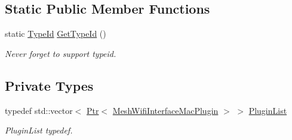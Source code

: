 \subsection*{Static Public Member Functions}
\begin{DoxyCompactItemize}
\item 
static \hyperlink{classns3_1_1TypeId}{Type\+Id} \hyperlink{classns3_1_1MeshWifiInterfaceMac_ac8a895086b33d99018b3e5b5b2add731}{Get\+Type\+Id} ()
\begin{DoxyCompactList}\small\item\em Never forget to support typeid. \end{DoxyCompactList}\end{DoxyCompactItemize}
\subsection*{Private Types}
\begin{DoxyCompactItemize}
\item 
typedef std\+::vector$<$ \hyperlink{classns3_1_1Ptr}{Ptr}$<$ \hyperlink{classns3_1_1MeshWifiInterfaceMacPlugin}{Mesh\+Wifi\+Interface\+Mac\+Plugin} $>$ $>$ \hyperlink{classns3_1_1MeshWifiInterfaceMac_aef7248bc33791dc738bd042c5459ad88}{Plugin\+List}
\begin{DoxyCompactList}\small\item\em Plugin\+List typedef. \end{DoxyCompactList}\end{DoxyCompactItemize}
